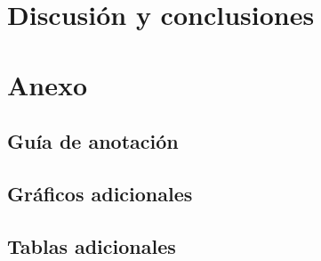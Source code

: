 \documentclass[colorinlistoftodos]{article}
\begin{document}
\section{Discusi\'on y conclusiones}\label{section-discussion}





\clearpage
\appendix
\section{Anexo}\label{appendix}

\subsection{Gu\'ia de anotaci\'on}\label{appendix-annotation}


\subsection{Gr\'aficos adicionales}\label{appendix-plots}


\subsection{Tablas adicionales}\label{appendix-tables}



\end{document}
